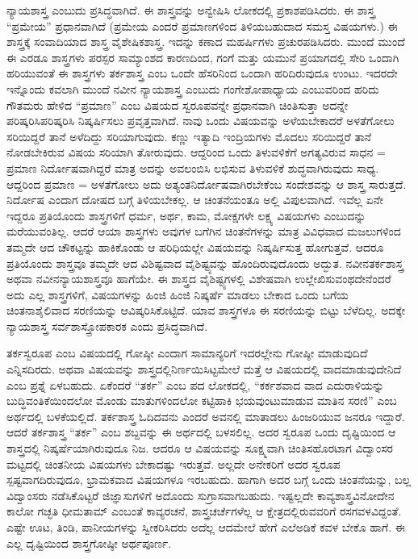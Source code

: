 {ನ್ಯಾಯಶಾಸ್ತ್ರ ಎಂಬುದು ಪ್ರಸಿದ್ಧವಾಗಿದೆ.  ಈ ಶಾಸ್ತ್ರವನ್ನು ಅನ್ವೇಷಿಸಿ ಲೋಕದಲ್ಲಿ ಪ್ರಕಾಶಪಡಿಸಿದರು. ಈ ಶಾಸ್ತ್ರ “ಪ್ರಮೇಯ” ಪ್ರಧಾನವಾಗಿದೆ \enginline{-} (ಪ್ರಮೇಯ ಎಂದರೆ ಪ್ರಮಾಣಗಳಿಂದ ತಿಳಿಯಬಹುದಾದ ಸಮಸ್ತ ವಿಷಯಗಳು.) ಈ  ಶಾಸ್ತ್ರಕ್ಕೆ ಸಂವಾದಿಯಾದ ಶಾಸ್ತ್ರ ವೈಶೇಷಿಕಶಾಸ್ತ್ರ. ಇದನ್ನು ಕಣಾದ ಮಹರ್ಷಿಗಳು ಪ್ರಚುರ\-ಪಡಿಸಿದರು. ಮುಂದೆ ಮುಂದೆ ಈ ಎರಡೂ ಶಾಸ್ತ್ರಗಳು ಪರಸ್ಪರ ಸಾಮ್ಯಾಂಶದ ಕಾರಣದಿಂದ, ಗಂಗೆ ಮತ್ತು ಯಮುನೆ ಪ್ರಯಾಗದಲ್ಲಿ ಸೇರಿ ಒಂದಾಗಿ ಹರಿಯುವಂತೆ  ಈ ಶಾಸ್ತ್ರಗಳು ತರ್ಕಶಾಸ್ತ್ರ ಎಂಬ ಒಂದೇ ಹೆಸರಿನಿಂದ ಒಂದಾಗಿ ಹರಿದಿರುವುದೂ ಉಂಟು. ಇದರದೇ ಇನ್ನೊಂದು ಕವಲಾಗಿ ಮುಂದೆ ನವೀನ ನ್ಯಾಯಶಾಸ್ತ್ರ ಎಂಬುದು ಗಂಗೇಶೋಪಾಧ್ಯಾಯ ಎಂಬುವರಿಂದ ಹರಿದು ಗೌತಮರು ಹೇಳಿದ “ಪ್ರಮಾಣ” ಎಂಬ ವಿಷಯದ ಸ್ವರೂಪವನ್ನೇ ಪ್ರಧಾನವಾಗಿ ಚಿಂತಿಸುತ್ತಾ ಅದನ್ನೇ ಪರಿಷ್ಕರಿಸಿ\break ಪರಿಷ್ಕರಿಸಿ ನಿಷ್ಕರ್ಷಿಸಲು ಪ್ರವೃತ್ತವಾಗಿದೆ. ನಾವು ಒಂದು ವಿಷಯವನ್ನು ಅಳೆಯ\-ಬೇಕಾದರೆ ಅಳತೆಗೋಲು ಸರಿಯಿದ್ದರೆ ತಾನೆ ಅಳೆದಿದ್ದು ಸರಿಯಾಗುವುದು. ಕಣ್ಣು ಇತ್ಯಾದಿ ಇಂದ್ರಿಯಗಳು ಮೊದಲು ಸರಿಯಿದ್ದರೆ ತಾನೆ ನೋಡಬೇಕಿರುವ ವಿಷಯ ಸರಿಯಾಗಿ ತೋರುವುದು. ಆದ್ದರಿಂದ ಒಂದು ತಿಳುವಳಿಕೆಗೆ ಅಗತ್ಯವಿರುವ ಸಾಧನ = ಪ್ರಮಾಣ ನಿರ್ದೋಷವಾಗಿದ್ದರೆ ಮಾತ್ರ ಅದನ್ನು ಅವಲಂಬಿಸಿ ಲಭಿಸುವ ತಿಳುವಳಿಕೆ ಶುದ್ಧವಾಗಿರುವುದು ಸಾಧ್ಯ. ಆದ್ದರಿಂದ ಪ್ರಮಾಣ = ಅಳತೆಗೋಲು ಅದು ಅತ್ಯಂತ\break ನಿರ್ದೋಷವಾಗಿರಬೇಕೆಂಬ ಸಂದೇಶವನ್ನು ಆ ಶಾಸ್ತ್ರ ಸಾರುತ್ತದೆ. ನಿರ್ದೋಷ ಎಂದಾಗ ದೋಷದ ಬಗ್ಗೆ ತಿಳಿಯಬೇಕಲ್ಲ. ಆ ಚಿಂತನೆಯಂತೂ ಅಲ್ಲಿ ವಿಪುಲವಾಗಿದೆ. ಇವೆಲ್ಲ ಏನೇ ಇದ್ದರೂ ಪ್ರತಿಯೊಂದು ಶಾಸ್ತ್ರಗಳಿಗೆ ಧರ್ಮ, ಅರ್ಥ, ಕಾಮ, ಮೋಕ್ಷಗಳೇ ಲಕ್ಷ್ಯ ವಿಷಯಗಳು ಎಂಬುದನ್ನು ಮರೆಯುವಂತಿಲ್ಲ. ಆದರೆ ಆಯಾ ಶಾಸ್ತ್ರಗಳು ಅವುಗಳ ಬಗೆಗಿನ ಚಿಂತನೆಗಳನ್ನು ಮಾತ್ರ ವಿವಿಧವಾದ ಮಜಲುಗಳಿಂದ ತಮ್ಮದೇ ಆದ ಚೌಕಟ್ಟನ್ನು ಹಾಕಿಕೊಂಡು ಆ ಪರಿಧಿಯಲ್ಲೇ ವಿಷಯವನ್ನು ನಿಷ್ಕರ್ಷಿಸುತ್ತ ಹೋಗುತ್ತವೆ. ಆದರೂ ಪ್ರತಿಯೊಂದು ಶಾಸ್ತ್ರವೂ ತಮ್ಮದೇ ಆದ ವಿಶಿಷ್ಟವಾದ ವೈಶಿಷ್ಟ್ಯವನ್ನು ಹೊಂದಿರುವುದೊಂದು ಅದ್ಭುತ. ನವೀನತರ್ಕಶಾಸ್ತ್ರ ಅಥವಾ ನವೀನನ್ಯಾಯಶಾಸ್ತ್ರವೂ ಹಾಗೆಯೇ. ಈ ಶಾಸ್ತ್ರದ ವೈಶಿಷ್ಟ್ಯಗಳಲ್ಲಿ ವಿಶೇಷವಾಗಿ ಉಲ್ಲೇಖಿಸುವಂಥದೇನೆಂದರೆ ಅದು ಎಲ್ಲ ಶಾಸ್ತ್ರಗಳಿಗೆ, ವಿಷಯಗಳನ್ನು ಹಿಂಜಿ ಹಿಂಜಿ ನಿಷ್ಕರ್ಷೆ ಮಾಡಲು ಬೇಕಾದ ಒಂದು ಬಗೆಯ ಚಿಂತನಾಶೈಲಿ\enginline{-}ವಾದ ಸರಣಿಯನ್ನು ಆವಿಷ್ಕರಿಸಿಕೊಟ್ಟಿದೆ. ಯಾವ ಶಾಸ್ತ್ರಗಳೂ ಈ ಸರಣಿಯನ್ನು ಬಿಟ್ಟು ಬೆಳೆದಿಲ್ಲ. ಅದಕ್ಕೇ ನ್ಯಾಯಶಾಸ್ತ್ರ ಸರ್ವಶಾಸ್ತ್ರೋಪಕಾರಕ ಎಂದು ಪ್ರಸಿದ್ಧವಾಗಿದೆ. 

ತರ್ಕಸ್ವರೂಪ ಎಂಬ ವಿಷಯದಲ್ಲಿ ಗೋಷ್ಠೀ ಎಂದಾಗ ಸಾಮಾನ್ಯರಿಗೆ \hbox{ಇದರಲ್ಲೇನು} ಗೋಷ್ಠೀ ಮಾಡುವುದಿದೆ ಎನ್ನಿಸದಿರದು. ಅಥವಾ ವಿಷಯವನ್ನು ಶಾಸ್ತ್ರದಲ್ಲಿ\break ನಿರ್ಣಯಿಸಿಟ್ಟಮೇಲೆ ಮತ್ತೆ ಆ ವಿಷಯದಲ್ಲಿ ವಾದಮಾಡುವುದೇನಿದೆ ಎಂಬ ಪ್ರಶ್ನೆ ಏಳಬಹುದು. ಏಕೆಂದರೆ  “ತರ್ಕ” ಎಂಬ ಪದ ಲೋಕದಲ್ಲಿ, “ಕರ್ಕಶವಾದ ವಾದ \enginline{-} ಎದುರಾಳಿಯನ್ನು ಬುದ್ಧಿವಂತಿಕೆಯಿಂದಲೋ ಮೊಂಡು ಮಾತುಗಳಿಂದಲೋ ಕಟ್ಟಿಹಾಕಿ  ಭಯವುಂಟುಮಾಡುವ ಮಾತಿನ ಸರಣಿ” ಎಂಬ ಅರ್ಥದಲ್ಲಿ ಬಳಕೆಯಲ್ಲಿದೆ. ತರ್ಕಶಾಸ್ತ್ರ ಓದಿದವನು ಎಂದರೆ ಅವನಲ್ಲಿ ಮಾತಾಡಲು ಹಿಂಜರಿಯುವ ಜನರೂ ಇದ್ದಾರೆ. ಆದರೆ ತರ್ಕಶಾಸ್ತ್ರ “ತರ್ಕ” ಎಂಬ ಶಬ್ದವನ್ನು ಈ ಅರ್ಥದಲ್ಲಿ ಬಳಸಲಿಲ್ಲ. ಅದರ ಸ್ವರೂಪ ಒಂದು ದೃಷ್ಟಿಯಿಂದ ಆ ಶಾಸ್ತ್ರದಲ್ಲಿ ನಿಷ್ಕರ್ಷೆಯಾಗಿರುವುದೂ ನಿಜ. ಆದರೂ ಆ ವಿಷಯವನ್ನು ಸೂಕ್ಷ್ಮವಾಗಿ ಚಿಂತಿಸಹೊರಟಾಗ ವಿದ್ವಾಂಸರ ಮಟ್ಟದಲ್ಲಿ ಚಿಂತನೀಯ ವಿಷಯಗಳು ಬೇಕಾದಷ್ಟು ಇರುತ್ತವೆ. ಅಲ್ಲದೇ ಅನೇಕರಿಗೆ ಅದರ ಸ್ವರೂಪ ಸ್ಪಷ್ಟವಾಗ\-ದಿರುವುದೂ, ಭ್ರಾಮಕವಾದ ವಿಷಯಗಳೂ ಇರಬಹುದು. ಹಾಗಾಗಿ ಅದರ ಬಗ್ಗೆ ಒಂದು ಚಿಂತನೆಯನ್ನು, ಬಲ್ಲ ವಿದ್ವಾಂಸರು ನಡೆಸಿಕೊಟ್ಟರೆ ಜಿಜ್ಞಾಸುಗಳಿಗೆ ಅದೊಂದು ಸುಗ್ರಾಸವಾಗಬಹುದು. ಇಷ್ಟಲ್ಲದೇ ಕಾವ್ಯಶಾಸ್ತ್ರವಿನೋದೇನ ಕಾಲೋ ಗಚ್ಛತಿ ಧೀಮತಾಮ್ ಎಂಬಂತೆ ಕಾವ್ಯರಚನೆ, ಶಾಸ್ತ್ರಚರ್ಚೆಗಳೆಲ್ಲ ಆ ಕ್ಷೇತ್ರದಲ್ಲಿರುವವರಿಗೆ ರಸಗವಳವಿದ್ದಂತೆ. ಎಷ್ಟೇ ಊಟ, ತಿಂಡಿ, ಪಾನೀಯಗಳನ್ನು ಸ್ವೀಕರಿಸಿದರು \hbox{ಅದೆಲ್ಲ} ಆದಮೇಲೆ ಹೇಗೆ ಎಲೆ\enginline{-}ಅಡಿಕೆ ಕವಳ ಬೇಕೊ ಹಾಗೆ. ಈ ಎಲ್ಲ ದೃಷ್ಟಿಯಿಂದ ಶಾಸ್ತ್ರ\-ಗೋಷ್ಠೀ ಅರ್ಥಪೂರ್ಣ.  

}
